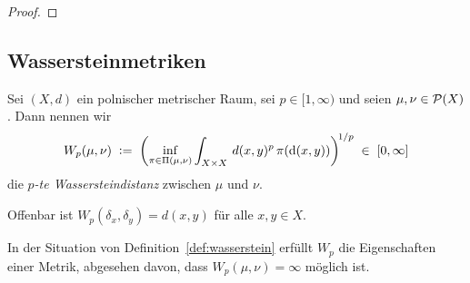 \documentclass[../main/main.tex]{subfiles}
\begin{document}
	\begin{proof}
	\end{proof}

	\subsection{Wassersteinmetriken}

	\begin{Definition}
		\label{def:wasserstein}
		Sei $(X, d)$ ein polnischer metrischer Raum, sei $p \in [1, \infty)$ und seien $\mu, \nu \in \mathcal{P}(X)$. Dann nennen wir
		$$ W_p(\mu, \nu) \; \vcentcolon = \; \left(\inf_{\pi \in \Pi(\mu, \nu)} \int_{X \times X} \, d(x, y)^p \, \pi(\mathrm{d}(x, y))\right)^{\! 1/p} \; \in \; [0, \infty] $$
		die \emph{$p$-te Wassersteindistanz} zwischen $\mu$ und $\nu$.
	\end{Definition}

	\begin{Bemerkung}
		Offenbar ist $W_p(\delta_x, \delta_y) = d(x, y)$ für alle $x, y \in X$. 
	\end{Bemerkung}

	\begin{Satz}
		\label{thm:wassersteinismetric}
		In der Situation von Definition~\ref{def:wasserstein} erfüllt $W_p$ die Eigenschaften einer Metrik, abgesehen davon, dass $W_p(\mu, \nu) = \infty$ möglich ist.
	\end{Satz}
\end{document}
